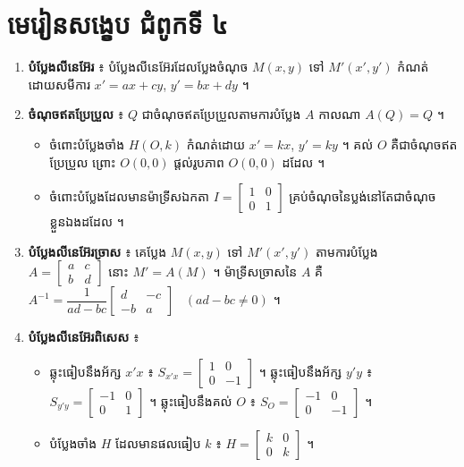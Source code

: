 \section*{មេរៀនសង្ខេប ជំពូកទី ៤}
\begin{note}[មេរៀនសង្ខេប]
\begin{enumerate}[1]
  \item \textbf{បំប្លែងលីនេអ៊ែរ} ៖ បំប្លែងលីនេអ៊ែរដែលប្លែងចំណុច $M(x, y)$ ទៅ $M'(x', y')$ កំណត់ដោយសមីការ $x' = ax + cy$, $y' = bx + dy$ ។
  \item \textbf{ចំណុចឥតប្រែប្រួល} ៖ $Q$ ជាចំណុចឥតប្រែប្រួលតាមការបំប្លែង $A$ កាលណា $A(Q) = Q$ ។
  \begin{itemize}
    \item ចំពោះបំប្លែងចាំង $H(O, k)$ កំណត់ដោយ $x' = kx$, $y' = ky$ ។ គល់ $O$ គឺជាចំណុចឥតប្រែប្រួល ព្រោះ $O(0, 0)$ ផ្ដល់រូបភាព $O(0, 0)$ ដដែល ។
    \item ចំពោះបំប្លែងដែលមានម៉ាទ្រីសឯកតា $I = \begin{bmatrix} 1 & 0\\ 0 & 1 \end{bmatrix}$ គ្រប់ចំណុចនៃប្លង់នៅតែជាចំណុចខ្លួនឯងដដែល ។
  \end{itemize}
  \item \textbf{បំប្លែងលីនេអ៊ែរច្រាស} ៖ គេប្លែង $M(x, y)$ ទៅ $M'(x', y')$ តាមការបំប្លែង $A = \begin{bmatrix} a & c\\ b & d \end{bmatrix}$ នោះ $M' = A(M)$ ។ ម៉ាទ្រីសច្រាសនៃ $A$ គឺ $A^{-1} = \dfrac{1}{ad - bc}\begin{bmatrix} d & -c\\ -b & a \end{bmatrix}$ \ $(ad - bc \ne 0)$ ។
  \item \textbf{បំប្លែងលីនេអ៊ែរពិសេស} ៖
  \begin{itemize}
    \item ឆ្លុះធៀបនឹងអ័ក្ស $x'x$ ៖ $S_{x'x} = \begin{bmatrix} 1 & 0\\ 0 & -1 \end{bmatrix}$ ។ ឆ្លុះធៀបនឹងអ័ក្ស $y'y$ ៖ $S_{y'y} = \begin{bmatrix} -1 & 0\\ 0 & 1 \end{bmatrix}$ ។ ឆ្លុះធៀបនឹងគល់ $O$ ៖ $S_O = \begin{bmatrix} -1 & 0\\ 0 & -1 \end{bmatrix}$ ។
    \item បំប្លែងចាំង $H$ ដែលមានផលធៀប $k$ ៖ $H = \begin{bmatrix} k & 0\\ 0 & k \end{bmatrix}$ ។

\end{itemize}
\end{enumerate}
\end{note}
